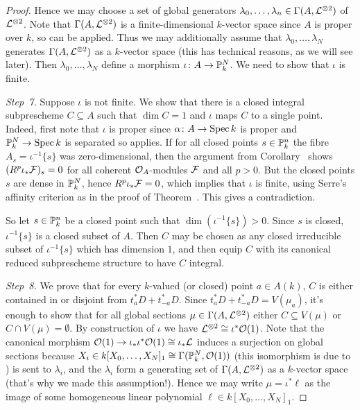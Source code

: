 \documentclass[a4paper,parskip=half,numbers=enddot, DIV=12]{scrreprt}
\begin{document}
\begin{proof}
	Hence we may choose a set of global generators $\lambda_0,\ldots,\lambda_n\in\Gamma(A,\mathcal{L}^{\otimes 2})$ of $\mathcal{L}^{\otimes 2}$. Note that $\Gamma(A,\mathcal{L}^{\otimes 2})$ is a finite-dimensional $k$-vector space since $A$ is proper over $k$, so \cite[Theorem~5]{alggeo2} can be applied. Thus we may additionally assume that $\lambda_0,\ldots,\lambda_N$ generates $\Gamma(A,\mathcal{L}^{\otimes 2})$ as a $k$-vector space (this has technical reasons, as we will see later). Then $\lambda_0,\ldots,\lambda_N$ define a morphism $\iota\colon A\morphism\IP_k^N$. We need to show that $\iota$ is finite.
	
	\emph{Step~7.} Suppose $\iota$ is not finite. We show that there is a closed integral subprescheme $C\subseteq A$ such that $\dim C=1$ and $\iota$ maps $C$ to a single point. Indeed, first note that $\iota$ is proper since $\alpha\colon A\morphism \Spec k$ is proper and $\IP_k^N\morphism\Spec k$ is separated so \cite[Proposition~2.4.1]{alggeo2} applies. If for all closed points $s\in \mathbb{P}_k^n$ the fibre $A_s=\iota^{-1}\{s\}$ was zero-dimensional, then the argument from Corollary~ shows $(R^p\iota_*\mathcal{F})_s=0$ for all coherent $\mathcal{O}_A$-modules $\mathcal{F}$ and all $p>0$. But the closed points $s$ are dense in $\mathbb{P}_k^N$, hence $R^p\iota_*\mathcal{F}=0$, which implies that $\iota$ is finite, using Serre's affinity criterion as in the proof of Theorem~. This gives a contradiction.
	
	So let $s\in \mathbb{P}_k^n$ be a closed point such that $\dim (\iota^{-1}\{s\})>0$. Since $s$ is closed, $\iota^{-1}\{s\}$ is a closed subset of $A$. Then $C$ may be chosen as any closed irreducible subset of $\iota^{-1}\{s\}$ which has dimension $1$, and then equip $C$ with its canonical reduced subprescheme structure to have $C$ integral.
	
	\emph{Step~8.} We prove that for every $k$-valued (or closed) point $a\in A(k)$, $C$ is either contained in or disjoint from $t_a^*D+t_{-a}^*D$. Since $t_a^*D+t_{-a}^*D=V(\mu_a)$, it's enough to show that for all global sections $\mu\in\Gamma(A,\mathcal{L}^{\otimes 2})$ either $C\subseteq V(\mu)$ or $C\cap V(\mu)=\emptyset$. By construction of $\iota$ we have $\mathcal{L}^{\otimes 2}\cong \iota^*\mathcal{O}(1)$. Note that the canonical morphism $\Oo(1)\morphism\iota_*\iota^*\Oo(1)\cong \iota_*\Ll$ induces a surjection on global sections because $X_i\in k[X_0,\ldots,X_N]_1\cong \Gamma(\mathbb{P}_k^N,\mathcal{O}(1))$ (this isomorphism is due to \cite[Theorem~2]{alggeo2}) is sent to $\lambda_i$, and the $\lambda_i$ form a generating set of $\Gamma(A,\mathcal{L}^{\otimes 2})$ as a $k$-vector space (that's why we made this assumption!). Hence we may write $\mu=\iota^*\ell$ as the image of some homogeneous linear polynomial $\ell\in k[X_0,\ldots,X_N]_1$.
	

\end{proof}
\end{document}
